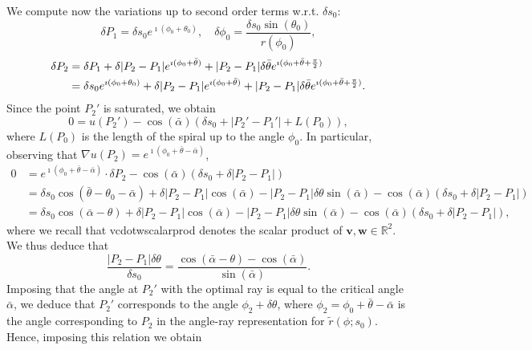 \documentclass[reqno]{amsart}
\theoremstyle{definition} \newtheorem{definition}{Definition}[section]
\theoremstyle{definition} \newtheorem{remark}[definition]{Remark}
\theoremstyle{plain} \newtheorem{lemma}[definition]{Lemma}
\theoremstyle{plain} \newtheorem{proposition}[definition]{Proposition}
\theoremstyle{plain} \newtheorem{theorem}[definition]{Theorem}
\theoremstyle{plain} \newtheorem{corollary}[definition]{Corollary}
\theoremstyle{definition} \newtheorem{example}[definition]{Example}
\theoremstyle{plain} \newtheorem{claim}[clai]{Claim}
\theoremstyle{definition} \newtheorem{assumption}[definition]{Assumption}
\theoremstyle{definition} \newtheorem{observation}[definition]{Observation}
\newcommand{\R}{\mathbb{R}}
\newcommand{\1}{\mathbbm 1}
\renewcommand{\i}{\imath}
\numberwithin{equation}{section} %
\theoremstyle{plain} \newtheorem*{theorem*}{Theorem}
\theoremstyle{plain} \newtheorem{mthm}[maintheorem]{Main Theorem}
\theoremstyle{plain} \newtheorem*{mthm*}{Main Theorem}
\theoremstyle{plain} \newtheorem*{conjecture*}{Conjecture}
\theoremstyle{plain} \newtheorem{conjecture}[definition]{Conjecture}
\theoremstyle{plain} \newtheorem*{problem*}{Problem}
\begin{document}
We compute now the variations up to second order terms w.r.t. $\delta s_0$:
\begin{equation*}%
\delta P_1 = \delta s_0 e^{\i (\phi_0 + \theta_0)}, \quad \delta \phi_0 = \frac{\delta s_0 \sin(\theta_0)}{r(\phi_0)},
\end{equation*}
\begin{align*}%
\delta P_2 &= \delta P_1 + \delta |P_2 - P_1| e^{\i (\phi_0 + \bar \theta)} + |P_2 - P_1| \delta \bar \theta e^{\i (\phi_0 + \bar \theta + \frac{\pi}{2})} \\
\notag &= \delta s_0 e^{\i (\phi_0 + \theta_0)} + \delta |P_2 - P_1| e^{\i (\phi_0 + \bar \theta)} + |P_2 - P_1| \delta \bar \theta e^{\i (\phi_0 + \bar \theta + \frac{\pi}{2})}.
\end{align*}
Since the point $P_2'$ is saturated, we obtain
\begin{equation*}
0 = u(P_2') - \cos(\bar \alpha) (\delta s_0 + |P_2' - P_1'|+L(P_0)),
\end{equation*}
where $L(P_0)$ is the length of the spiral up to the angle $\phi_0$. In particular, observing that $\nabla u(P_2) = e^{\i (\phi_0 + \bar \theta - \bar \alpha)}$,
\begin{align*}
 0 &= e^{\i (\phi_0 + \bar \theta - \bar \alpha)} \cdot \delta P_2 - \cos(\bar \alpha) (\delta s_0 + \delta |P_2 - P_1|) \\
&= \delta s_0 \cos(\bar \theta - \theta_0 - \bar \alpha) + \delta |P_2 - P_1| \cos(\bar \alpha) - |P_2 - P_1| \delta \theta \sin(\bar \alpha) - \cos(\bar \alpha) (\delta s_0 + \delta |P_2 - P_1|) \\
&= \delta s_0 \cos(\bar \alpha - \theta) + \delta |P_2 - P_1| \cos(\bar \alpha) - |P_2 - P_1| \delta \theta \sin(\bar \alpha) - \cos(\bar \alpha) (\delta s_0 + \delta |P_2 - P_1|),
\end{align*}
where we recall that \gls{vcdotwscalarprod} denotes the scalar product of $\mathbf v,\mathbf w \in \R^2$. We thus deduce that
\begin{equation}
\label{Equa:delta_theta_segm_1}
\frac{|P_2 - P_1| \delta \theta}{\delta s_0} = \frac{\cos(\bar \alpha - \theta) - \cos(\bar \alpha)}{\sin(\bar \alpha)}.
\end{equation}
Imposing that the angle at $P_2'$ with the optimal ray is equal to the critical angle $\bar \alpha$, we deduce that $P_2'$ corresponds to the angle $\phi_2 + \delta \theta$, where $\phi_2 = \phi_0 + \bar \theta - \bar \alpha$ is the angle corresponding to $P_2$ in the angle-ray representation for $\tilde r(\phi;s_0)$. Hence, imposing this relation we obtain
\end{document}
